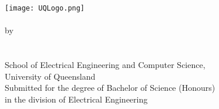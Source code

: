 \begin{titlepage}
	\begin{center}
		\texttt{[image: UQLogo.png]}\\
        \vfill
		\huge\textbf{\covertext}\\
        \vfill
		\large by\\
		\vspace{5mm}
		\Large\textbf{\authortext}\\
        \large \studentnotext \\
        \large {}
        \vfill
		\large School of Electrical Engineering and Computer Science,\\\smallskip
        \large University of Queensland\\
        \vfill
		\large Submitted for the degree of Bachelor of Science (Honours)\\\smallskip
        \large in the division of Electrical Engineering
        \vfill
		\large \thesisduedate
	\end{center}
\end{titlepage}